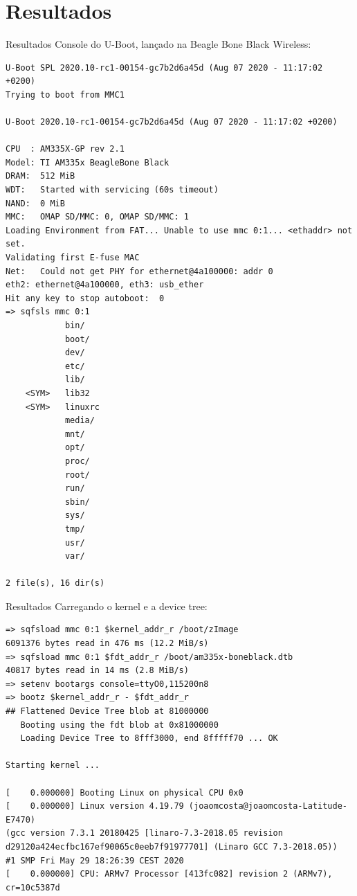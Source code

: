 \section{Resultados}
\begin{frame}[fragile]{Resultados}
Console do U-Boot, lançado na Beagle Bone Black Wireless:
\begin{verbatim}
U-Boot SPL 2020.10-rc1-00154-gc7b2d6a45d (Aug 07 2020 - 11:17:02 +0200)
Trying to boot from MMC1

U-Boot 2020.10-rc1-00154-gc7b2d6a45d (Aug 07 2020 - 11:17:02 +0200)

CPU  : AM335X-GP rev 2.1
Model: TI AM335x BeagleBone Black
DRAM:  512 MiB
WDT:   Started with servicing (60s timeout)
NAND:  0 MiB
MMC:   OMAP SD/MMC: 0, OMAP SD/MMC: 1
Loading Environment from FAT... Unable to use mmc 0:1... <ethaddr> not set.
Validating first E-fuse MAC
Net:   Could not get PHY for ethernet@4a100000: addr 0
eth2: ethernet@4a100000, eth3: usb_ether
Hit any key to stop autoboot:  0
=> sqfsls mmc 0:1
            bin/
            boot/
            dev/
            etc/
            lib/
    <SYM>   lib32
    <SYM>   linuxrc
            media/
            mnt/
            opt/
            proc/
            root/
            run/
            sbin/
            sys/
            tmp/
            usr/
            var/

2 file(s), 16 dir(s)
\end{verbatim}
\end{frame}

\begin{frame}[fragile]{Resultados}
Carregando o kernel e a device tree:
\begin{verbatim}
=> sqfsload mmc 0:1 $kernel_addr_r /boot/zImage
6091376 bytes read in 476 ms (12.2 MiB/s)
=> sqfsload mmc 0:1 $fdt_addr_r /boot/am335x-boneblack.dtb
40817 bytes read in 14 ms (2.8 MiB/s)
=> setenv bootargs console=ttyO0,115200n8
=> bootz $kernel_addr_r - $fdt_addr_r
## Flattened Device Tree blob at 81000000
   Booting using the fdt blob at 0x81000000
   Loading Device Tree to 8fff3000, end 8fffff70 ... OK

Starting kernel ...

[    0.000000] Booting Linux on physical CPU 0x0
[    0.000000] Linux version 4.19.79 (joaomcosta@joaomcosta-Latitude-E7470)
(gcc version 7.3.1 20180425 [linaro-7.3-2018.05 revision
d29120a424ecfbc167ef90065c0eeb7f91977701] (Linaro GCC 7.3-2018.05))
#1 SMP Fri May 29 18:26:39 CEST 2020
[    0.000000] CPU: ARMv7 Processor [413fc082] revision 2 (ARMv7), cr=10c5387d
\end{verbatim}
\end{frame}



